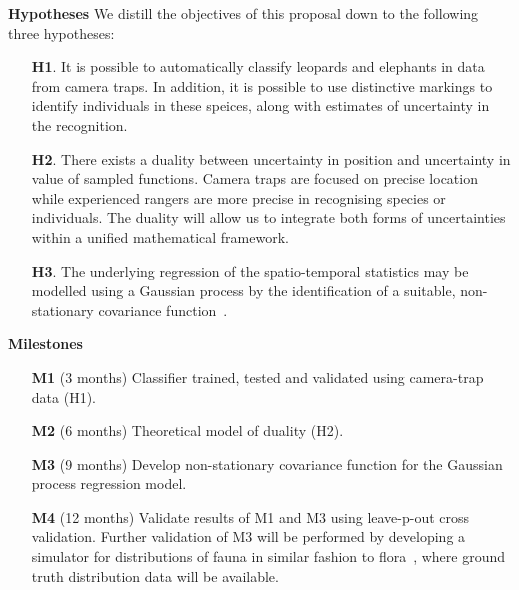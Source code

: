 \documentclass[a4paper,10pt,twocolumn]{article}
\newcommand{\hdg}[1] {\noindent \textbf{#1} }
\begin{document}
\hdg{Hypotheses}
We distill the objectives of this proposal down to the following three hypotheses:
\begin{itemize}[topsep=-2.1ex,itemsep=-.7ex,leftmargin=1ex,itemindent=3ex]
 \item [\textbf{H1}.] It is possible to automatically classify leopards and elephants in data from camera traps. In addition, it is possible to use distinctive markings to identify individuals in these speices, along with estimates of uncertainty in the recognition.
 \item [\textbf{H2}.] There exists a duality between uncertainty in position and uncertainty in value of sampled functions. Camera traps are focused on precise location while experienced rangers are more precise in recognising species or individuals. The duality will allow us to integrate both forms of uncertainties within a unified mathematical framework.
 \item [\textbf{H3}.] The underlying regression of the spatio-temporal statistics may be modelled using a Gaussian process by the identification of a suitable, non-stationary covariance function~\cite{paciorek2003nonstationary}.
\end{itemize}
\vspace{2.5ex}
% 

\hdg{Milestones}
\begin{enumerate} [topsep=-1ex,itemsep=-.1ex,leftmargin=1ex,itemindent=3ex]
 \item [\textbf{M1}] (3  months) Classifier trained, tested and validated using camera-trap data (H1).
 \item [\textbf{M2}] (6  months) Theoretical model of duality (H2).
 \item [\textbf{M3}] (9 months) Develop non-stationary covariance function for the Gaussian process regression model.
 \item [\textbf{M4}] (12 months) Validate results of M1 and M3 using leave-p-out cross validation. Further validation of M3 will be performed by developing a simulator for distributions of fauna in similar fashion to flora~\cite{Bradbury15Guided}, where ground truth distribution data will be available.
 \end{enumerate}
\vspace{2.5ex}
\end{document}
